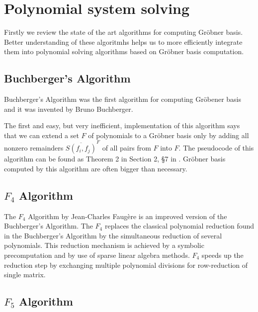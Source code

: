 \chapter{Polynomial system solving}
Firstly we review the state of the art algorithms for computing Gr\"obner basis. Better understanding of these algoritmhs helps us to more efficiently integrate them into polynomial solving algorithms based on Gr\"obner basis computation.

\section{Buchberger's Algorithm}
Buchberger's Algorithm was the first algorithm for computing Gr\"obener basis and it was invented by Bruno Buchberger.

The first and easy, but very inefficient, implementation of this algorithm says that we can extend a set $F$ of polynomials to a Gr\"obner basis only by adding all nonzero remainders $\overline{S(f_i, f_j)}^F$ of all pairs from $F$ into $F$.  The pseudocode of this algorithm can be found as Theorem 2 in Section 2, \S 7 in \cite{Cox-Little-Shea97}. Gr\"obner basis computed by this algorithm are often bigger than necessary.

\section{$F_4$ Algorithm}
The $F_4$ Algorithm \cite{F4} by Jean-Charles Faug\`ere is an improved version of the Buchberger's Algorithm. The $F_4$ replaces the classical polynomial reduction found in the Buchberger's Algorithm by the simultaneous reduction of several polynomials. This reduction mechanism is achieved by a symbolic precomputation and by use of sparse linear algebra methods. $F_4$  speeds up the reduction step by exchanging multiple polynomial divisions for row-reduction of single matrix.

\section{$F_5$ Algorithm}
